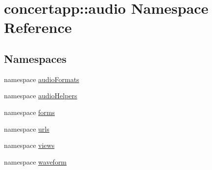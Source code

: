 \hypertarget{namespaceconcertapp_1_1audio}{
\section{concertapp::audio Namespace Reference}
\label{namespaceconcertapp_1_1audio}
}
\subsection*{Namespaces}
\begin{DoxyCompactItemize}
\item 
namespace \hyperlink{namespaceconcertapp_1_1audio_1_1audio_formats}{audioFormats}
\item 
namespace \hyperlink{namespaceconcertapp_1_1audio_1_1audio_helpers}{audioHelpers}
\item 
namespace \hyperlink{namespaceconcertapp_1_1audio_1_1forms}{forms}
\item 
namespace \hyperlink{namespaceconcertapp_1_1audio_1_1urls}{urls}
\item 
namespace \hyperlink{namespaceconcertapp_1_1audio_1_1views}{views}
\item 
namespace \hyperlink{namespaceconcertapp_1_1audio_1_1waveform}{waveform}
\end{DoxyCompactItemize}
